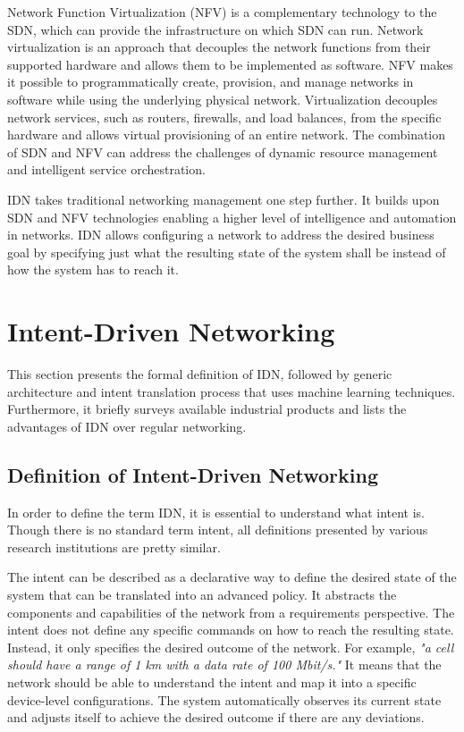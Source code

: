 Network Function Virtualization (NFV) is a complementary technology to the SDN, which can provide the infrastructure on which SDN can run. Network virtualization is an approach that decouples the network functions from their supported hardware and allows them to be implemented as software. NFV makes it possible to programmatically create, provision, and manage networks in software while using the underlying physical network. Virtualization decouples network services, such as routers, firewalls, and load balances, from the specific hardware and allows virtual provisioning of an entire network. The combination of SDN and NFV can address the challenges of dynamic resource management and intelligent service orchestration. \cite{Li2015}

IDN takes traditional networking management one step further. It builds upon SDN and NFV technologies enabling a higher level of intelligence and automation in networks. IDN allows configuring a network to address the desired business goal by specifying just what the resulting state of the system shall be instead of how the system has to reach it.


\section{Intent-Driven Networking}
\label{sec:Intent_Driven_Networking}
This section presents the formal definition of IDN, followed by generic architecture and intent translation process that uses machine learning techniques. Furthermore, it briefly surveys available industrial products and lists the advantages of IDN over regular networking.

\subsection{Definition of Intent-Driven Networking}
In order to define the term IDN, it is essential to understand what intent is. Though there is no standard term intent, all definitions presented by various research institutions are pretty similar.

The intent can be described as a declarative way to define the desired state of the system that can be translated into an advanced policy. It abstracts the components and capabilities of the network from a requirements perspective. The intent does not define any specific commands on how to reach the resulting state. Instead, it only specifies the desired outcome of the network. For example, \textit{"a cell should have a range of 1 km with a data rate of 100 Mbit/s."} It means that the network should be able to understand the intent and map it into a specific device-level configurations.  The system automatically observes its current state and adjusts itself to achieve the desired outcome if there are any deviations. \cite[22867]{8968429}

